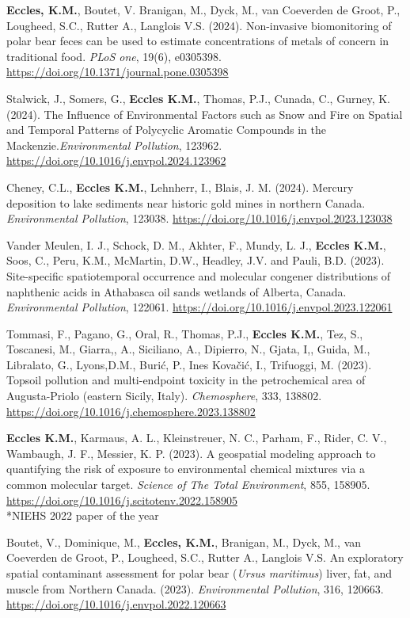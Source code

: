 \documentclass[margin,line]{res}
\begin{document}
\begin{resume}

\textbf{Eccles, K.M.}, Boutet, V. Branigan, M., Dyck, M., van Coeverden de Groot, P., Lougheed, S.C., Rutter A., Langlois V.S. (2024). Non-invasive biomonitoring of polar bear feces can be used to estimate concentrations of metals of concern in traditional food. \textit{PLoS one}, 19(6), e0305398. \url{https://doi.org/10.1371/journal.pone.0305398}
\pagebreak

Stalwick, J., Somers, G., \textbf{Eccles K.M.}, Thomas, P.J., Cunada, C., Gurney, K. (2024). The Influence of Environmental Factors such as Snow and Fire on Spatial and Temporal Patterns of Polycyclic Aromatic Compounds in the Mackenzie.\textit{Environmental Pollution}, 123962. \url{https://doi.org/10.1016/j.envpol.2024.123962}

Cheney, C.L., \textbf{Eccles K.M.}, Lehnherr, I., Blais, J. M. (2024). Mercury deposition to lake sediments near historic gold mines in northern Canada. \textit{Environmental Pollution}, 123038. \url{https://doi.org/10.1016/j.envpol.2023.123038}

Vander Meulen, I. J., Schock, D. M., Akhter, F., Mundy, L. J., \textbf{Eccles K.M.}, Soos, C., Peru, K.M., McMartin, D.W., Headley, J.V. and Pauli, B.D. (2023). Site-specific spatiotemporal occurrence and molecular congener distributions of naphthenic acids in Athabasca oil sands wetlands of Alberta, Canada. \textit{Environmental Pollution}, 122061. \url{https://doi.org/10.1016/j.envpol.2023.122061}

Tommasi, F., Pagano, G., Oral, R., Thomas, P.J., \textbf{Eccles K.M.}, Tez, S., Toscanesi, M., Giarra,, A., Siciliano, A., Dipierro, N., Gjata, I,, Guida, M., Libralato, G., Lyons,D.M., Burić, P., Ines Kovačić, I.,  Trifuoggi, M. (2023). Topsoil pollution and multi-endpoint toxicity in the petrochemical area of Augusta-Priolo (eastern Sicily, Italy). \textit{Chemosphere}, 333, 138802. \url{https://doi.org/10.1016/j.chemosphere.2023.138802}

\textbf{Eccles K.M.}, Karmaus, A. L., Kleinstreuer, N. C., Parham, F., Rider, C. V., Wambaugh, J. F., Messier, K. P. (2023). A geospatial modeling approach to quantifying the risk of exposure to environmental chemical mixtures via a common molecular target. \textit{Science of The Total Environment}, 855, 158905. \url{https://doi.org/10.1016/j.scitotenv.2022.158905}\\
\mbox{*}NIEHS 2022 paper of the year

Boutet, V., Dominique, M., \textbf{Eccles, K.M.}, Branigan, M., Dyck, M., van Coeverden de Groot, P., Lougheed, S.C., Rutter A., Langlois V.S. An exploratory spatial contaminant assessment for polar bear (\textit{Ursus maritimus}) liver, fat, and muscle from Northern Canada. (2023). \textit{Environmental Pollution}, 316, 120663. \url{https://doi.org/10.1016/j.envpol.2022.120663}


\end{resume}
\end{document}
